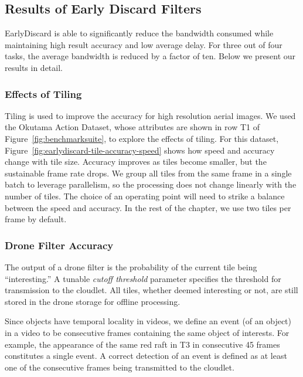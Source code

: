 \subsection{Results of Early Discard Filters}
\label{sec:earlydiscard-result}

EarlyDiscard is able to significantly reduce the bandwidth consumed while
maintaining high result accuracy and low average delay. For three out of four
tasks, the average bandwidth is reduced by a factor of ten. Below we present
our results in detail.

\subsubsection{Effects of Tiling}
Tiling is used to improve the accuracy
for high resolution aerial images. We used the Okutama Action Dataset, whose
attributes are shown in row T1 of Figure~\ref{fig:benchmarksuite}, to explore
the effects of tiling.  For this dataset,
Figure~\ref{fig:earlydiscard-tile-accuracy-speed} shows how speed and accuracy
change with tile size.  Accuracy improves as tiles become smaller, but the
sustainable frame rate drops.  We group all tiles from the same frame in a
single batch to leverage parallelism, so the processing does not change linearly
with the number of tiles. The choice of an operating point will need to strike a
balance between the speed and accuracy.  In the rest of the chapter, we use two
tiles per frame by default. 

\subsubsection{Drone Filter Accuracy}
The output of a drone filter is the
probability of the current tile being ``interesting.''  A tunable {\em cutoff
threshold} parameter specifies the threshold for transmission to the cloudlet.
All tiles, whether deemed interesting or not, are still stored in the drone
storage for offline processing.

Since objects have temporal locality in videos, we define an event (of an
object) in a video to be consecutive frames containing the same object of
interests. For example, the appearance of the same red raft in T3 in consecutive
45 frames constitutes a single event. A correct detection of an event is defined
as at least one of the consecutive frames being transmitted to the cloudlet.  

